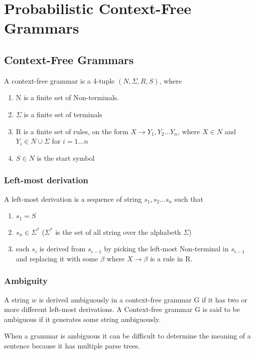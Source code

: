 \section{Probabilistic Context-Free Grammars}


\subsection{Context-Free Grammars}
A context-free grammar is a 4-tuple $(N, \Sigma, R, S)$, where
\begin{enumerate}
\item N is a finite set of Non-terminals.   
\item $\Sigma$ is a finite set of terminals 
\item R is a finite set of rules, on the form $X \rightarrow Y_1,Y_2 ... Y_n$,
where $X \in N$ and $Y_i \in N \cup \Sigma$ for $i = 1 ... n$
\item $S \in N$ is the start symbol
\end{enumerate}
\cite[p.104]{sipser}
\cite[p.1]{collins}

\subsubsection{Left-most derivation}
A left-most derivation is a sequence of string $s_1, s_2 ... s_n$ such that
\begin{enumerate}
\item $s_1 = S$
\item $s_n \in \Sigma^*$ ($\Sigma^*$ is the set of all string over the alphabeth $\Sigma$)
\item each $s_i$ is derived from $s_{i-1}$ by picking the left-most Non-terminal in $s_{i-1}$ and replacing it with some $\beta$ where $X \rightarrow \beta$  is a rule in R.
\end{enumerate} 
\cite[p.2]{collins}

\subsubsection{Ambiguity}
A string $w$ is derived ambiguously in a context-free grammar G if it has two or
more different left-most derivations.
A Context-free grammar G is said to be ambiguous if it generates some string ambiguously.
\cite[p.108]{sipser}

When a grammar is ambiguous it can be difficult to determine the meaning of a sentence because
it has multiple parse trees.

